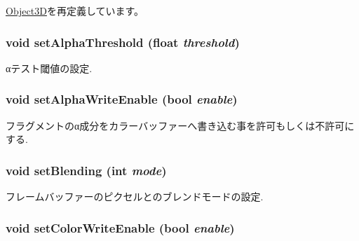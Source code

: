 \hyperlink{classm3g_1_1Object3D_1efcb1973989d9963d5bd6d03065d389}{Object3D}を再定義しています。\hypertarget{classm3g_1_1CompositingMode_6becafaefd18a2b8b1adeba491576837}{
\subsubsection[{setAlphaThreshold}]{\setlength{\rightskip}{0pt plus 5cm}void setAlphaThreshold (float {\em threshold})}}
\label{classm3g_1_1CompositingMode_6becafaefd18a2b8b1adeba491576837}


αテスト閾値の設定. \hypertarget{classm3g_1_1CompositingMode_5204f1acac056f82d322262703be67b0}{
\subsubsection[{setAlphaWriteEnable}]{\setlength{\rightskip}{0pt plus 5cm}void setAlphaWriteEnable (bool {\em enable})}}
\label{classm3g_1_1CompositingMode_5204f1acac056f82d322262703be67b0}


フラグメントのα成分をカラーバッファーへ書き込む事を許可もしくは不許可にする. \hypertarget{classm3g_1_1CompositingMode_4c09465dfec9efa000c115c5c2867b63}{
\subsubsection[{setBlending}]{\setlength{\rightskip}{0pt plus 5cm}void setBlending (int {\em mode})}}
\label{classm3g_1_1CompositingMode_4c09465dfec9efa000c115c5c2867b63}


フレームバッファーのピクセルとのブレンドモードの設定. \hypertarget{classm3g_1_1CompositingMode_84f7cba08f5a2bea05de4fc3154a50b2}{
\subsubsection[{setColorWriteEnable}]{\setlength{\rightskip}{0pt plus 5cm}void setColorWriteEnable (bool {\em enable})}}
\label{classm3g_1_1CompositingMode_84f7cba08f5a2bea05de4fc3154a50b2}


